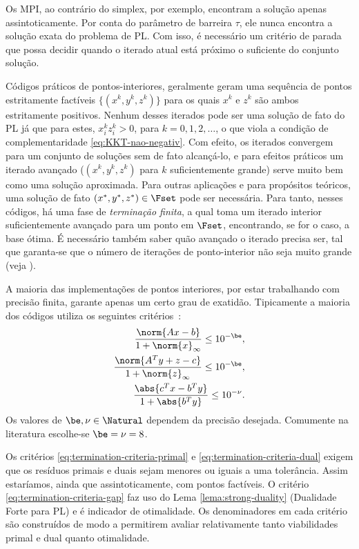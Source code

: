 Os \ac{MPI}, ao contrário do  simplex, por exemplo, encontram a solução apenas
assintoticamente. Por conta do parâmetro de barreira $\tau$, ele nunca encontra
a solução exata do problema de \ac{PL}. Com isso, é necessário um critério de
parada que possa decidir quando o iterado atual está próximo o suficiente 
do conjunto solução. 


Códigos práticos de pontos-interiores,  geralmente geram uma sequência de
pontos estritamente factíveis $\{(x^k,y^k,z^k)\}$ para os quais $x^k$ e $z^k$
são ambos estritamente positivos. Nenhum desses iterados pode ser uma solução de
fato do \ac{PL} já que para estes, $x^k_iz^k_i>0$, para $k=0,1,2,\ldots$, o que
viola a condição de complementaridade \eqref{eq:KKT-nao-negativ}. Com efeito, os
iterados convergem para um conjunto de soluções sem de fato alcançá-lo, e para
efeitos práticos um iterado avançado ($(x^k,y^k,z^k)$ para $k$ suficientemente
grande) serve muito bem como uma solução aproximada. Para outras aplicações e
para propósitos teóricos, uma solução de fato $(x^*,y^*,z^*)\in\Fset$ pode ser
necessária. Para tanto, nesses códigos,  há uma fase de
\emph{terminação finita}, a qual toma um iterado interior suficientemente avançado
para um ponto em $\Fset$, encontrando, se for o caso, a base ótima. É
necessário também saber quão avançado o iterado precisa ser, tal que
garanta-se que o número de iterações de ponto-interior não seja muito grande
(veja \cite[Cap. 7]{Wright:Primal-dual-interior-point:1997h}).

A maioria das implementações de pontos interiores, por estar trabalhando com
precisão finita, garante apenas um certo grau de exatidão. Tipicamente a maioria
dos códigos utiliza os seguintes critérios~\cite{Gondzio:1996:CVI}:	
\begin{subequations}
\label{eq:termination-criteria}
\begin{align}
	\dfrac{\norm{Ax - b}}{1 + \norm{x}_{\infty}} \leq 10^{-\be},
	\label{eq:termination-criteria-primal}\\ 
	\dfrac{\norm{A^Ty + z - c}}{1 + \norm{z}_{\infty}} \leq
	10^{-\be},\label{eq:termination-criteria-dual} \\ 
	\dfrac{\abs{c^Tx - b^T y}}{1 + \abs{b^Ty}}\leq
	10^{-\nu}.\label{eq:termination-criteria-gap}
\end{align}
\end{subequations}
Os valores de $\be,\nu\in\Natural$ dependem da precisão desejada. Comumente na
literatura escolhe-se $\be=\nu=8$.  


Os critérios
\eqref{eq:termination-criteria-primal} e \eqref{eq:termination-criteria-dual}
exigem que os resíduos primais e duais sejam menores ou iguais a uma tolerância.
Assim estaríamos, ainda que assintoticamente, com pontos factíveis. O critério
\eqref{eq:termination-criteria-gap} faz uso do Lema
\ref{lema:strong-duality} (Dualidade Forte para \ac{PL}) e é indicador de
otimalidade. Os denominadores em cada critério são construídos de modo a 
permitirem avaliar relativamente tanto viabilidades primal e dual quanto
otimalidade.
  
